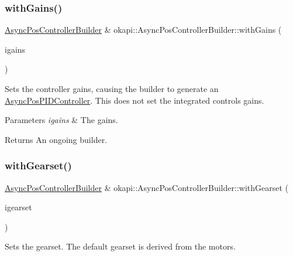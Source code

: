 \subsubsection{\texorpdfstring{withGains()}{withGains()}}
{\footnotesize\ttfamily \mbox{\hyperlink{classokapi_1_1AsyncPosControllerBuilder}{Async\+Pos\+Controller\+Builder}} \& okapi\+::\+Async\+Pos\+Controller\+Builder\+::with\+Gains (\begin{DoxyParamCaption}\item[{const \mbox{\hyperlink{structokapi_1_1IterativePosPIDController_1_1Gains}{Iterative\+Pos\+P\+I\+D\+Controller\+::\+Gains}} \&}]{igains }\end{DoxyParamCaption})}

Sets the controller gains, causing the builder to generate an \mbox{\hyperlink{classokapi_1_1AsyncPosPIDController}{Async\+Pos\+P\+I\+D\+Controller}}. This does not set the integrated control\textquotesingle{}s gains.


\begin{DoxyParams}{Parameters}
{\em igains} & The gains. \\
\hline
\end{DoxyParams}
\begin{DoxyReturn}{Returns}
An ongoing builder. 
\end{DoxyReturn}
\mbox{\label{classokapi_1_1AsyncPosControllerBuilder_a70ac24982216681b1e05a20306b2271b}} 
\subsubsection{\texorpdfstring{withGearset()}{withGearset()}}
{\footnotesize\ttfamily \mbox{\hyperlink{classokapi_1_1AsyncPosControllerBuilder}{Async\+Pos\+Controller\+Builder}} \& okapi\+::\+Async\+Pos\+Controller\+Builder\+::with\+Gearset (\begin{DoxyParamCaption}\item[{const \mbox{\hyperlink{structokapi_1_1AbstractMotor_1_1GearsetRatioPair}{Abstract\+Motor\+::\+Gearset\+Ratio\+Pair}} \&}]{igearset }\end{DoxyParamCaption})}

Sets the gearset. The default gearset is derived from the motor\textquotesingle{}s.


